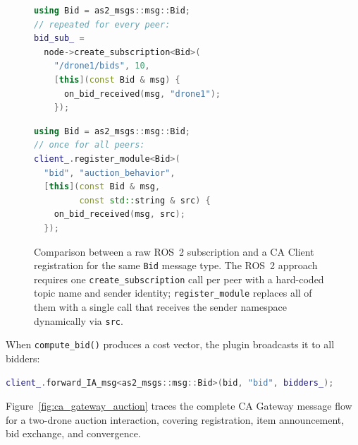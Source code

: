 \documentclass[deliverable]{csreport}
\renewcommand{\code}[1]{\texttt{\textcolor{CSMaroon}{#1}}}%
\begin{document}
\begin{figure}[tbh]
\centering
\begin{minipage}[t]{0.47\linewidth}
\begin{lstlisting}[language=C++, style=cppcolors,
  title={Raw ROS~2 (one per peer)},
  basicstyle=\ttfamily\footnotesize]
using Bid = as2_msgs::msg::Bid;
// repeated for every peer:
bid_sub_ =
  node->create_subscription<Bid>(
    "/drone1/bids", 10,
    [this](const Bid & msg) {
      on_bid_received(msg, "drone1");
    });
\end{lstlisting}
\end{minipage}%
\hfill
\begin{minipage}[t]{0.47\linewidth}
\begin{lstlisting}[language=C++, style=cppcolors,
  title={CA Client (all peers)},
  basicstyle=\ttfamily\footnotesize]
using Bid = as2_msgs::msg::Bid;
// once for all peers:
client_.register_module<Bid>(
  "bid", "auction_behavior",
  [this](const Bid & msg,
         const std::string & src) {
    on_bid_received(msg, src);
  });
\end{lstlisting}
\end{minipage}
\caption{Comparison between a raw ROS~2 subscription and a CA Client registration for the same \code{Bid} message type. The ROS~2 approach requires one \code{create\_subscription} call per peer with a hard-coded topic name and sender identity; \code{register\_module} replaces all of them with a single call that receives the sender namespace dynamically via \code{src}.}
\label{fig:register_vs_sub}
\end{figure}

When \code{compute\_bid()} produces a cost vector, the plugin broadcasts it to all bidders:

\begin{lstlisting}[language=C++, style=cppcolors,caption={Broadcasting the bid modelet}]
client_.forward_IA_msg<as2_msgs::msg::Bid>(bid, "bid", bidders_);
\end{lstlisting}

Figure~\ref{fig:ca_gateway_auction} traces the complete CA Gateway message flow for a two-drone auction interaction, covering registration, item announcement, bid exchange, and convergence.
\end{document}
